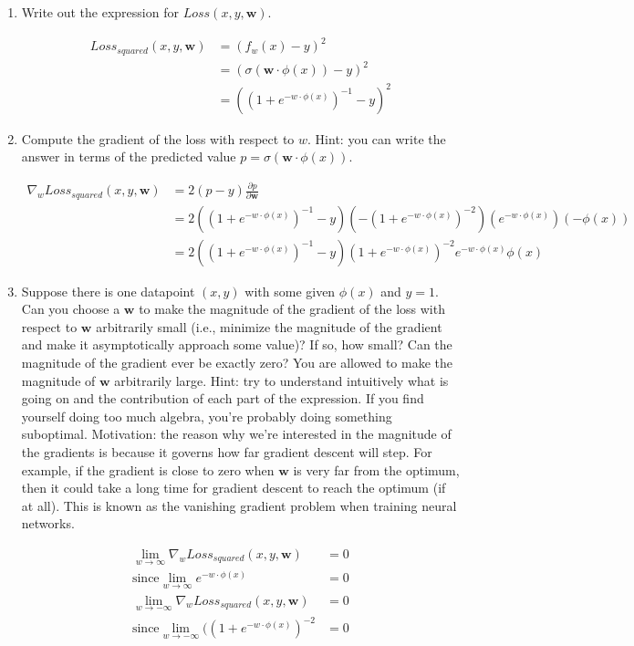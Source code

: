 \documentclass[10pt]{article}
\begin{document}
\begin{enumerate}[label=(\alph*)]

  \item Write out the expression for $Loss(x, y, \mathbf{w})$.
  
  \begin{align*}
  Loss_{squared} (x, y, \mathbf{w}) &= (f_w(x) - y)^2\\
  &= (\sigma(\mathbf{w} \cdot \phi(x)) - y)^2\\
  &= ((1 + e^{-w \cdot \phi(x)})^{-1} - y)^2
  \end{align*}
  
  \item Compute the gradient of the loss with respect to $w$. Hint: you can write the answer in terms of the predicted value $p = \sigma(\mathbf{w} \cdot \phi(x))$.
  
  \begin{align*}
  \nabla_w Loss_{squared} (x, y, \mathbf{w}) &= 2(p - y) \frac{\partial p}{\partial \mathbf{w}}\\
  &= 2((1 + e^{-w \cdot \phi(x)})^{-1} - y)(-(1 + e^{-w \cdot \phi(x)})^{-2})(e^{-w \cdot \phi(x)})(-\phi(x))\\
  &= 2((1 + e^{-w \cdot \phi(x)})^{-1} - y)(1 + e^{-w \cdot \phi(x)})^{-2}e^{-w \cdot \phi(x)}\phi(x)
  \end{align*}
  
  \item Suppose there is one datapoint $(x, y)$ with some given $\phi(x)$ and $y = 1$. Can you choose a $\mathbf{w}$ to make the magnitude of the gradient of the loss with respect to $\mathbf{w}$ arbitrarily small (i.e., minimize the magnitude of the gradient and make it asymptotically approach some value)? If so, how small? Can the magnitude of the gradient ever be exactly zero? You are allowed to make the magnitude of $\mathbf{w}$ arbitrarily large. Hint: try to understand intuitively what is going on and the contribution of each part of the expression. If you find yourself doing too much algebra, you're probably doing something suboptimal. Motivation: the reason why we're interested in the magnitude of the gradients is because it governs how far gradient descent will step. For example, if the gradient is close to zero when $\mathbf{w}$ is very far from the optimum, then it could take a long time for gradient descent to reach the optimum (if at all). This is known as the vanishing gradient problem when training neural networks.
  
  \begin{align*}
  \lim_{w \to \infty} \nabla_w Loss_{squared} (x, y, \mathbf{w}) &= 0\\
  \text{since} \lim_{w \to \infty} e^{-w \cdot \phi(x)} &= 0\\
  \lim_{w \to -\infty} \nabla_w Loss_{squared} (x, y, \mathbf{w}) &= 0\\
  \text{since} \lim_{w \to -\infty} ((1 + e^{-w \cdot \phi(x)})^{-2} &= 0
  \end{align*}
  

\end{enumerate}
\end{document}
